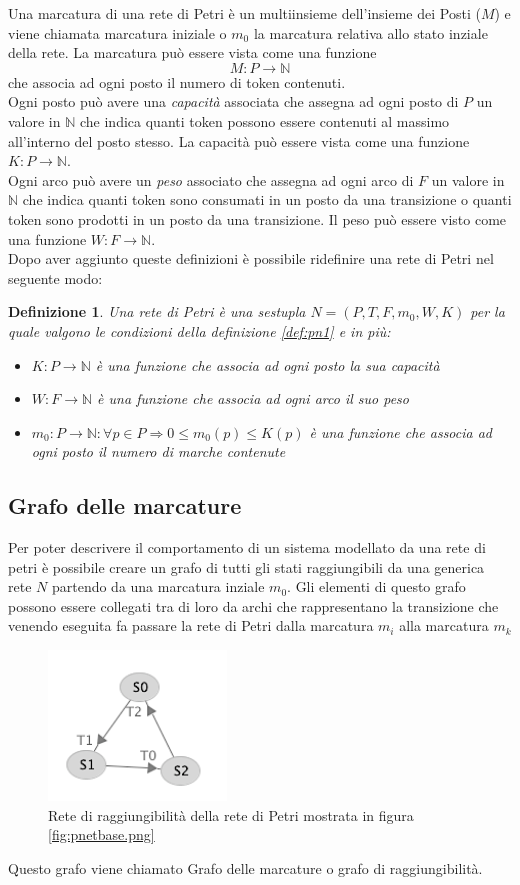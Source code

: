 \documentclass[italian,12pt]{book}
\newtheorem{mydef}{Definizione}
\begin{document}
Una marcatura di una rete di Petri è un multiinsieme dell'insieme dei
Posti ($M$) e viene chiamata marcatura iniziale o $m_0$ la marcatura
relativa allo stato inziale della rete. La marcatura può essere vista
come una funzione \[M : P \to \mathbb{N}\] che associa ad ogni posto il numero
di token contenuti.\\
Ogni posto può avere una \emph{capacità} associata che assegna ad ogni
posto di $P$ un valore in $\mathbb{N}$ che indica quanti token possono
essere contenuti al massimo all'interno del posto stesso. La capacità
può essere vista come una funzione $K : P \to \mathbb{N}$. \\
Ogni arco può avere un \emph{peso} associato che assegna ad ogni arco
di $F$ un valore in $\mathbb{N}$ che indica quanti token sono
consumati in un posto da una transizione o quanti token sono prodotti
in un posto da una transizione. Il peso può essere visto come una
funzione $W : F \to \mathbb{N}$. \\
Dopo aver aggiunto queste definizioni è possibile ridefinire una rete
di Petri nel seguente modo:
\begin{mydef}
Una rete di Petri è una sestupla $N = (P,T,F,m_0,W,K)$ per la quale
valgono le condizioni della definizione \ref{def:pn1} e in più:
\begin{itemize}
\item $K : P \to \mathbb{N}$ è una funzione che associa ad ogni posto
  la sua capacità
\item $W : F \to \mathbb{N}$ è una funzione che associa ad ogni arco
  il suo peso
\item $m_0 : P \to \mathbb{N} : \forall p \in P \Rightarrow 0 \leq m_0(p)
  \leq K(p)$ è una funzione che associa ad ogni posto il numero di
  marche contenute
\end{itemize}
\end{mydef}

\subsection{Grafo delle marcature}
Per poter descrivere il comportamento di un sistema modellato da una
rete di petri è possibile creare un grafo di tutti gli stati
raggiungibili da una generica rete $N$ partendo da una marcatura
inziale $m_0$. Gli elementi di questo grafo possono essere collegati
tra di loro da archi che rappresentano la transizione che venendo
eseguita fa passare la rete di Petri dalla marcatura $m_i$ alla
marcatura $m_k$
\begin{figure}[htb]
\centerline{\includegraphics[height=4cm]{img/reach_grap.png}}
\caption{Rete di raggiungibilità della rete di Petri mostrata in
  figura \ref{fig:pnetbase.png}}\label{fig:reach_grap_pnetbase.png}
\end{figure}
Questo grafo viene chiamato Grafo delle marcature o grafo di
raggiungibilità.
\end{document}
